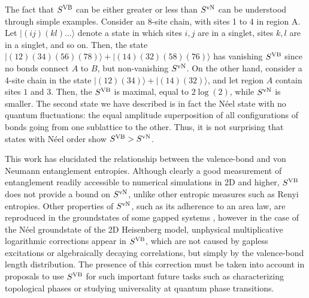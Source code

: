 \documentclass[prl,aps,twocolumn,floatfix,amsmath,amssymb,superscriptaddress,tightenlines]{revtex4}
\begin{document}
The fact  that $S^{\rm VB}$ can be either greater or less than $S^{ \rm vN}$ can be understood through simple
examples.  Consider an 8-site chain, with sites 1 to 4 in region A.  Let
$|(ij)(kl)...\rangle$ denote a state in which sites $i,j$ are in a singlet, sites $k,l$ are in a singlet, and so on.
Then, the state $|(12)(34)(56)(78)\rangle+|(14)(32)(58)(76)\rangle$ has vanishing $S^{\rm VB}$ since
no bonds connect $A$ to $B$, but non-vanishing $S^{ \rm vN}$.  
On the other hand, consider a 4-site chain in
the state $|(12)(34)\rangle+|(14)(32)\rangle$, and let region $A$ contain sites $1$ and $3$.  Then, the $S^{\rm VB}$ is maximal,
equal to $2\log(2)$, while $S^{ \rm vN}$ is smaller.  The second state we have
described is in fact the N\'eel state with no
quantum fluctuations: the equal amplitude superposition of all configurations of bonds going from one sublattice to the other.
Thus, it is not surprising that states with N\'eel order show $S^{\rm VB} > S^{ \rm vN}$.


This work has elucidated the relationship between the valence-bond and von Neumann entanglement entropies.
Although clearly a good measurement of entanglement readily accessible to
numerical simulations in 2D and higher, $S^{\rm VB}$ does not provide a bound
on $S^{ \rm vN}$, unlike other entropic measures such as Renyi entropies.
Other properties of $S^{ \rm vN}$, such as its adherence to an area law, are
reproduced in the groundstates of some gapped systems \cite{Alet,Chh},
however in the case of the N\'eel groundstate of the 2D Heisenberg model,
unphysical multiplicative logarithmic corrections appear in $S^{\rm VB}$,
which are not caused by gapless excitations or algebraically decaying
correlations, but simply by the valence-bond length distribution.
The presence of this correction must
be taken into account in proposals to use $S^{\rm VB}$ for such important
future tasks such as characterizing topological phases 
or studying universality at quantum phase transitions.
\end{document}
